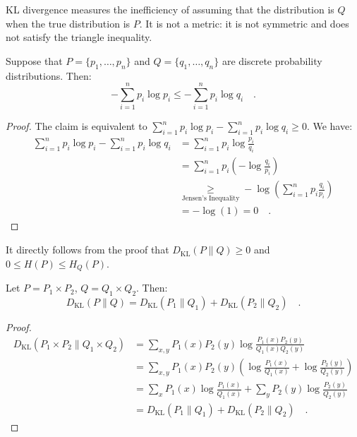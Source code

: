 \documentclass[../../main.tex]{subfiles}
\begin{document}
\begin{remark}
KL divergence measures the inefficiency of assuming that the distribution is \( Q \) when the true distribution is \( P \). It is not a metric: it is not symmetric and does not satisfy the triangle inequality.
\end{remark}

\begin{lemma}
    Suppose that $P = \{ p_1, \dots, p_n \}$ and $Q = \{ q_1, \dots, q_n \}$ are discrete probability distributions. Then:
    \[
        - \sum_{i = 1}^{n} p_i \log p_i \leq - \sum_{i = 1}^{n} p_i \log q_i \quad .
    \]
\end{lemma}
\begin{proof}
    The claim is equivalent to $\sum_{i = 1}^{n} p_i \log p_i - \sum_{i = 1}^{n} p_i \log q_i \geq 0$. We have:
    \begin{align*}
        \sum_{i = 1}^{n} p_i \log p_i - \sum_{i = 1}^{n} p_i \log q_i &= \sum_{i = 1}^{n} p_i \log \frac{p_i}{q_i} \\
        &= \sum_{i = 1}^{n} p_i \left( - \log \frac{q_i}{p_i} \right) \\
        &\underset{\text{Jensen's Inequality}}{\geq} - \log \left( \sum_{i = 1}^{n} p_i \frac{q_i}{p_i} \right) \\
        &= - \log(1) = 0 \quad .
    \end{align*}
\end{proof}

\begin{corollary}
    It directly follows from the proof that $D_{\mathrm{KL}}(P \| Q) \geq 0$ and $0 \leq H(P) \leq H_Q(P)$.
\end{corollary}

\pagebreak
\begin{proposition}[Additivity]
    Let \( P = P_1 \times P_2 \), \( Q = Q_1 \times Q_2 \). Then:
    \[
        D_{\mathrm{KL}}(P \| Q) = D_{\mathrm{KL}}(P_1 \| Q_1) + D_{\mathrm{KL}}(P_2 \| Q_2) \quad .
    \]
\end{proposition}
\begin{proof}
    \begin{align*}
        D_{\mathrm{KL}}(P_1 \times P_2 \| Q_1 \times Q_2)
        &= \sum_{x,y} P_1(x)P_2(y) \log \frac{P_1(x)P_2(y)}{Q_1(x)Q_2(y)} \\
        &= \sum_{x,y} P_1(x)P_2(y) \left( \log \frac{P_1(x)}{Q_1(x)} + \log \frac{P_2(y)}{Q_2(y)} \right) \\
        &= \sum_x P_1(x) \log \frac{P_1(x)}{Q_1(x)} + \sum_y P_2(y) \log \frac{P_2(y)}{Q_2(y)} \\
        &= D_{\mathrm{KL}}(P_1 \| Q_1) + D_{\mathrm{KL}}(P_2 \| Q_2) \quad .
    \end{align*}
\end{proof}
\end{document}
